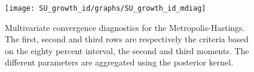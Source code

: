  
\begin{figure}[H]
\centering 
\texttt{[image: SU\_growth\_id/graphs/SU\_growth\_id\_mdiag]}
\caption{Multivariate convergence diagnostics for the Metropolis-Hastings.
The first, second and third rows are respectively the criteria based on
the eighty percent interval, the second and third moments. The different 
parameters are aggregated using the posterior kernel.}\label{Fig:MultivariateDiagnostics}
\end{figure}

